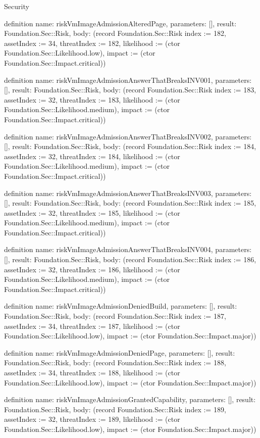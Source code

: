 \begin{lexlean}{Security}
\begin{semanticmodule}
definition{
  name: riskVmImageAdmissionAlteredPage,
  parameters: [],
  result: Foundation.Sec::Risk,
  body: (record Foundation.Sec::Risk {index := 182, assetIndex := 34, threatIndex := 182, likelihood := (ctor Foundation.Sec::Likelihood.low), impact := (ctor Foundation.Sec::Impact.critical)})
}

definition{
  name: riskVmImageAdmissionAnswerThatBreaksINV001,
  parameters: [],
  result: Foundation.Sec::Risk,
  body: (record Foundation.Sec::Risk {index := 183, assetIndex := 32, threatIndex := 183, likelihood := (ctor Foundation.Sec::Likelihood.medium), impact := (ctor Foundation.Sec::Impact.critical)})
}

definition{
  name: riskVmImageAdmissionAnswerThatBreaksINV002,
  parameters: [],
  result: Foundation.Sec::Risk,
  body: (record Foundation.Sec::Risk {index := 184, assetIndex := 32, threatIndex := 184, likelihood := (ctor Foundation.Sec::Likelihood.medium), impact := (ctor Foundation.Sec::Impact.critical)})
}

definition{
  name: riskVmImageAdmissionAnswerThatBreaksINV003,
  parameters: [],
  result: Foundation.Sec::Risk,
  body: (record Foundation.Sec::Risk {index := 185, assetIndex := 32, threatIndex := 185, likelihood := (ctor Foundation.Sec::Likelihood.medium), impact := (ctor Foundation.Sec::Impact.critical)})
}

definition{
  name: riskVmImageAdmissionAnswerThatBreaksINV004,
  parameters: [],
  result: Foundation.Sec::Risk,
  body: (record Foundation.Sec::Risk {index := 186, assetIndex := 32, threatIndex := 186, likelihood := (ctor Foundation.Sec::Likelihood.medium), impact := (ctor Foundation.Sec::Impact.critical)})
}

definition{
  name: riskVmImageAdmissionDeniedBuild,
  parameters: [],
  result: Foundation.Sec::Risk,
  body: (record Foundation.Sec::Risk {index := 187, assetIndex := 34, threatIndex := 187, likelihood := (ctor Foundation.Sec::Likelihood.low), impact := (ctor Foundation.Sec::Impact.major)})
}

definition{
  name: riskVmImageAdmissionDeniedPage,
  parameters: [],
  result: Foundation.Sec::Risk,
  body: (record Foundation.Sec::Risk {index := 188, assetIndex := 34, threatIndex := 188, likelihood := (ctor Foundation.Sec::Likelihood.low), impact := (ctor Foundation.Sec::Impact.major)})
}

definition{
  name: riskVmImageAdmissionGrantedCapability,
  parameters: [],
  result: Foundation.Sec::Risk,
  body: (record Foundation.Sec::Risk {index := 189, assetIndex := 32, threatIndex := 189, likelihood := (ctor Foundation.Sec::Likelihood.low), impact := (ctor Foundation.Sec::Impact.major)})
}


\end{semanticmodule}
\end{lexlean}
